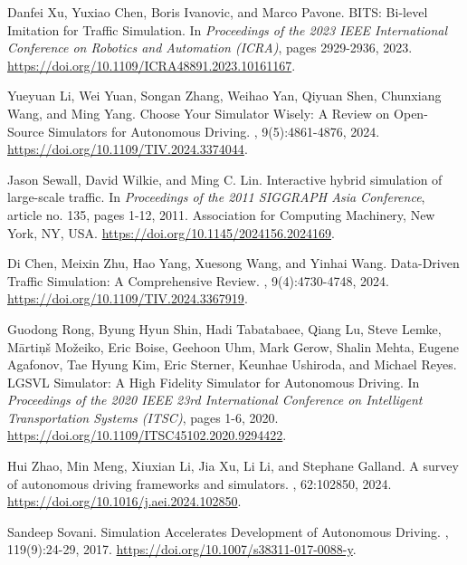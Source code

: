 \documentclass[lettersize,journal]{IEEEtran}
\begin{document}
\begin{thebibliography}{1}
Danfei Xu, Yuxiao Chen, Boris Ivanovic, and Marco Pavone.
\newblock BITS: Bi-level Imitation for Traffic Simulation.
\newblock In {\em Proceedings of the 2023 IEEE International Conference on Robotics and Automation (ICRA)}, pages 2929-2936, 2023.
\newblock \url{https://doi.org/10.1109/ICRA48891.2023.10161167}.

Yueyuan Li, Wei Yuan, Songan Zhang, Weihao Yan, Qiyuan Shen, Chunxiang Wang, and Ming Yang.
\newblock Choose Your Simulator Wisely: A Review on Open-Source Simulators for Autonomous Driving.
, 9(5):4861-4876, 2024.
\newblock \url{https://doi.org/10.1109/TIV.2024.3374044}.

Jason Sewall, David Wilkie, and Ming C. Lin.
\newblock Interactive hybrid simulation of large-scale traffic.
\newblock In {\em Proceedings of the 2011 SIGGRAPH Asia Conference}, article no. 135, pages 1-12, 2011.
\newblock Association for Computing Machinery, New York, NY, USA.
\newblock \url{https://doi.org/10.1145/2024156.2024169}.

Di Chen, Meixin Zhu, Hao Yang, Xuesong Wang, and Yinhai Wang.
\newblock Data-Driven Traffic Simulation: A Comprehensive Review.
, 9(4):4730-4748, 2024.
\newblock \url{https://doi.org/10.1109/TIV.2024.3367919}.

Guodong Rong, Byung Hyun Shin, Hadi Tabatabaee, Qiang Lu, Steve Lemke, Mārtiņš Možeiko, Eric Boise, Geehoon Uhm, Mark Gerow, Shalin Mehta, Eugene Agafonov, Tae Hyung Kim, Eric Sterner, Keunhae Ushiroda, and Michael Reyes.
\newblock LGSVL Simulator: A High Fidelity Simulator for Autonomous Driving.
\newblock In {\em Proceedings of the 2020 IEEE 23rd International Conference on Intelligent Transportation Systems (ITSC)}, pages 1-6, 2020.
\newblock \url{https://doi.org/10.1109/ITSC45102.2020.9294422}.

Hui Zhao, Min Meng, Xiuxian Li, Jia Xu, Li Li, and Stephane Galland.
\newblock A survey of autonomous driving frameworks and simulators.
, 62:102850, 2024.
\newblock \url{https://doi.org/10.1016/j.aei.2024.102850}.

Sandeep Sovani.
\newblock Simulation Accelerates Development of Autonomous Driving.
, 119(9):24-29, 2017.
\newblock \url{https://doi.org/10.1007/s38311-017-0088-y}.


\end{thebibliography}
\end{document}
